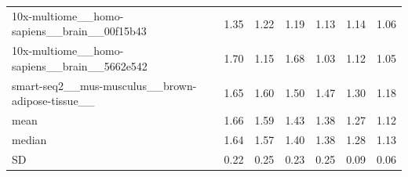 \begin{table}[H]
{\begin{tabular}{lrrrrrr}
10x-multiome\_\_homo-sapiens\_\_brain\_\_00f15b43 & 1.35 & 1.22 & 1.19 & 1.13 & 1.14 & 1.06 \\
10x-multiome\_\_homo-sapiens\_\_brain\_\_5662e542 & 1.70 & 1.15 & 1.68 & 1.03 & 1.12 & 1.05 \\
smart-seq2\_\_mus-musculus\_\_brown-adipose-tissue\_\_ & 1.65 & 1.60 & 1.50 & 1.47 & 1.30 & 1.18 \\
\midrule
mean & 1.66 & 1.59 & 1.43 & 1.38 & 1.27 & 1.12 \\
median & 1.64 & 1.57 & 1.40 & 1.38 & 1.28 & 1.13 \\
SD & 0.22 & 0.25 & 0.23 & 0.25 & 0.09 & 0.06 \\
\bottomrule\end{tabular}}\end{table}
